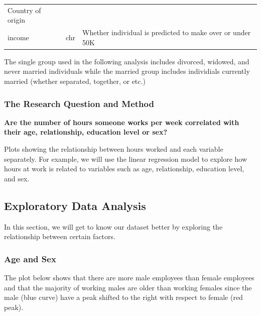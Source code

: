\documentclass[]{article}
\begin{document}
\begin{longtable}[]{@{}lll@{}}
\begin{minipage}[t]{0.26\columnwidth}
Country of origin\strut
\end{minipage}\tabularnewline
\begin{minipage}[t]{0.35\columnwidth}\raggedright
income\strut
\end{minipage} & \begin{minipage}[t]{0.30\columnwidth}\raggedright
chr\strut
\end{minipage} & \begin{minipage}[t]{0.26\columnwidth}\raggedright
Whether individual is predicted to make over or under 50K\strut
\end{minipage}\tabularnewline
\bottomrule
\end{longtable}

The single group used in the following analysis includes divorced,
widowed, and never married individuals while the married group includes
individials currently married (whether separated, together, or etc.)

\hypertarget{the-research-question-and-method}{%
\subsubsection{The Research Question and
Method}\label{the-research-question-and-method}}

\textbf{Are the number of hours someone works per week correlated with
their age, relationship, education level or sex?}

Plots showing the relationship between hours worked and each variable
separately. For example, we will use the linear regression model to
explore how hours at work is related to variables such as age,
relationship, education level, and sex.

\hypertarget{exploratory-data-analysis}{%
\subsection{Exploratory Data Analysis}\label{exploratory-data-analysis}}

In this section, we will get to know our dataset better by exploring the
relationship between certain factors.

\hypertarget{age-and-sex}{%
\subsubsection{Age and Sex}\label{age-and-sex}}

The plot below shows that there are more male employees than female
employees and that the majority of working males are older than working
females since the male (blue curve) have a peak shifted to the right
with respect to female (red peak).
\end{document}
